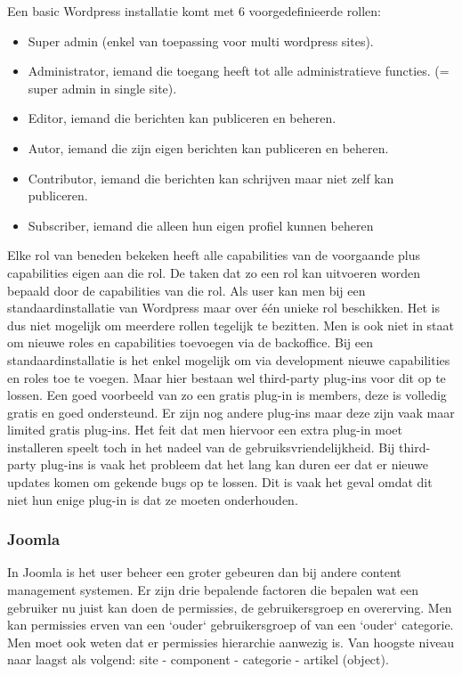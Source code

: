Een basic Wordpress installatie komt met 6 voorgedefinieerde rollen:
\begin{itemize}
	\item Super admin (enkel van toepassing voor multi wordpress sites).
	\item Administrator, iemand die toegang heeft tot alle administratieve functies. (= super admin in single site).
	\item Editor, iemand die berichten kan publiceren en beheren.
	\item Autor, iemand die zijn eigen berichten kan publiceren en beheren.
	\item Contributor, iemand die berichten kan schrijven maar niet zelf kan publiceren.
	\item Subscriber, iemand die alleen hun eigen profiel kunnen beheren
\end{itemize}
Elke rol van beneden bekeken heeft alle capabilities van de voorgaande plus capabilities eigen aan die rol. De taken dat zo een rol kan uitvoeren worden bepaald door de capabilities van die rol. Als user kan men bij een standaardinstallatie van Wordpress maar over één unieke rol beschikken. Het is dus niet mogelijk om meerdere rollen tegelijk te bezitten. Men is ook niet in staat om nieuwe roles en capabilities toevoegen via de backoffice. Bij een standaardinstallatie is het enkel mogelijk om via development nieuwe capabilities en roles toe te voegen. Maar hier bestaan wel third-party plug-ins voor dit op te lossen. Een goed voorbeeld van zo een gratis plug-in is members, deze is volledig gratis en goed ondersteund. Er zijn nog andere plug-ins maar deze zijn vaak maar limited gratis plug-ins. Het feit dat men hiervoor een extra plug-in moet installeren speelt toch in het nadeel van de gebruiksvriendelijkheid. Bij third-party plug-ins is vaak het probleem dat het lang kan duren eer dat er nieuwe updates komen om gekende bugs op te lossen. Dit is vaak het geval omdat dit niet hun enige plug-in is dat ze moeten onderhouden.

\subsubsection{Joomla}
In Joomla is het user beheer een groter gebeuren dan bij andere content management systemen. Er zijn drie bepalende factoren die bepalen wat een gebruiker nu juist kan doen de permissies, de gebruikersgroep en overerving. Men kan permissies erven van een `ouder` gebruikersgroep of van een `ouder` categorie. Men moet ook weten dat er permissies hierarchie aanwezig is. Van hoogste niveau naar laagst als volgend: site - component - categorie - artikel (object).

